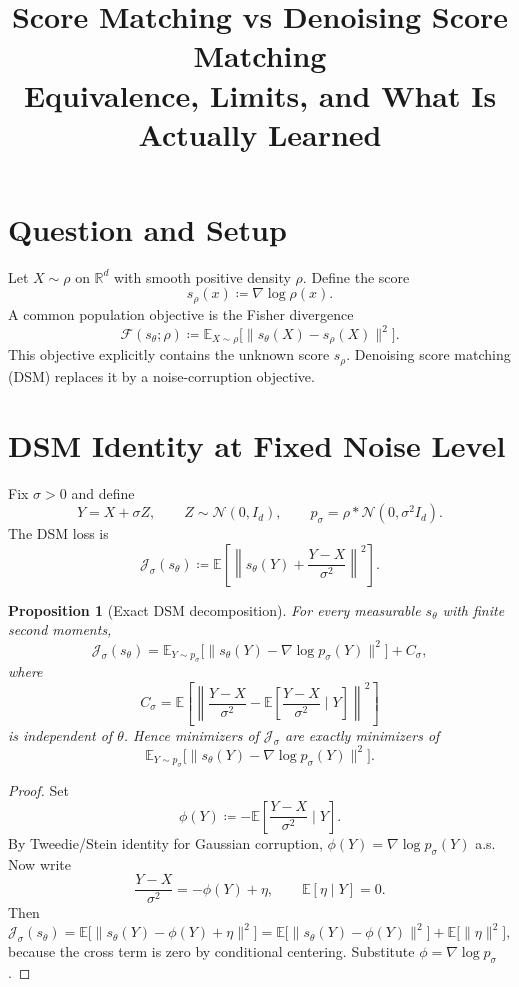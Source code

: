 \documentclass[11pt]{article}
\title{Score Matching vs Denoising Score Matching\\[0.3em]\large Equivalence, Limits, and What Is Actually Learned}
\author{}
\date{}
\newcommand{\E}{\mathbb E}
\newcommand{\R}{\mathbb R}
\newtheorem{proposition}{Proposition}
\begin{document}
\maketitle

\section{Question and Setup}
Let $X\sim \rho$ on $\R^d$ with smooth positive density $\rho$.
Define the score
\[
 s_\rho(x) \coloneqq \nabla \log \rho(x).
\]
A common population objective is the Fisher divergence
\begin{equation}
\label{eq:fisher}
\mathcal F(s_\theta;\rho)
\coloneqq
\E_{X\sim\rho}\!\big[\|s_\theta(X)-s_\rho(X)\|^2\big].
\end{equation}
This objective explicitly contains the unknown score $s_\rho$.
Denoising score matching (DSM) replaces it by a noise-corruption objective.

\section{DSM Identity at Fixed Noise Level}
Fix $\sigma>0$ and define
\[
Y = X + \sigma Z,
\qquad
Z\sim \mathcal N(0,I_d),
\qquad
p_\sigma = \rho * \mathcal N(0,\sigma^2 I_d).
\]
The DSM loss is
\begin{equation}
\label{eq:dsm-loss}
\mathcal J_\sigma(s_\theta)
\coloneqq
\E\!\left[\left\|s_\theta(Y)+\frac{Y-X}{\sigma^2}\right\|^2\right].
\end{equation}

\begin{proposition}[Exact DSM decomposition]
\label{prop:dsm-decomp}
For every measurable $s_\theta$ with finite second moments,
\begin{equation}
\label{eq:dsm-decomp}
\mathcal J_\sigma(s_\theta)
=
\E_{Y\sim p_\sigma}\!\big[\|s_\theta(Y)-\nabla\log p_\sigma(Y)\|^2\big]
+
C_\sigma,
\end{equation}
where
\[
C_\sigma
=
\E\!\left[\left\|\frac{Y-X}{\sigma^2}-\E\!\left[\frac{Y-X}{\sigma^2}\mid Y\right]\right\|^2\right]
\]
is independent of $\theta$.
Hence minimizers of $\mathcal J_\sigma$ are exactly minimizers of
\[
\E_{Y\sim p_\sigma}\!\big[\|s_\theta(Y)-\nabla\log p_\sigma(Y)\|^2\big].
\]
\end{proposition}

\begin{proof}
Set
\[
\phi(Y) \coloneqq -\E\!\left[\frac{Y-X}{\sigma^2}\mid Y\right].
\]
By Tweedie/Stein identity for Gaussian corruption, $\phi(Y)=\nabla\log p_\sigma(Y)$ a.s.
Now write
\[
\frac{Y-X}{\sigma^2} = -\phi(Y) + \eta,
\qquad
\E[\eta\mid Y]=0.
\]
Then
\[
\mathcal J_\sigma(s_\theta)
=
\E\big[\|s_\theta(Y)-\phi(Y)+\eta\|^2\big]
=
\E\big[\|s_\theta(Y)-\phi(Y)\|^2\big] + \E\big[\|\eta\|^2\big],
\]
because the cross term is zero by conditional centering.
Substitute $\phi=\nabla\log p_\sigma$.
\end{proof}
\end{document}
